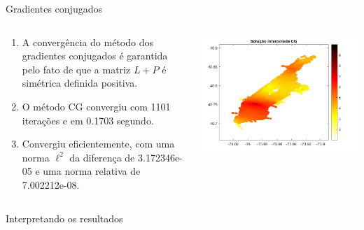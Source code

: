 \documentclass{beamer} %
\theoremstyle{definition}
\begin{document}
    \begin{frame}{Gradientes conjugados}
        \pause
        \begin{columns}
            \begin{column}{0.5\textwidth}            
                \begin{enumerate}
                    \item A convergência do método dos gradientes conjugados é garantida pelo fato de que a matriz  $L + P$ é simétrica definida positiva.
                    \pause
                    \item  O método CG convergiu com 1101 iterações e em 0.1703 segundo.
                    \pause
                    \item Convergiu eficientemente, com uma norma $\mathcal{\ell}^2$ da diferença de 3.172346e-05 e uma norma relativa de 7.002212e-08.
                    \pause
                \end{enumerate}
            \end{column}
            \begin{column}{0.5\textwidth}
                \centering
                \includegraphics[width=\textwidth]{CGinterpol.jpeg}
            \end{column}
        \end{columns}
    \end{frame}

    \begin{frame}{Interpretando os resultados}

    \end{frame}
\end{document}
